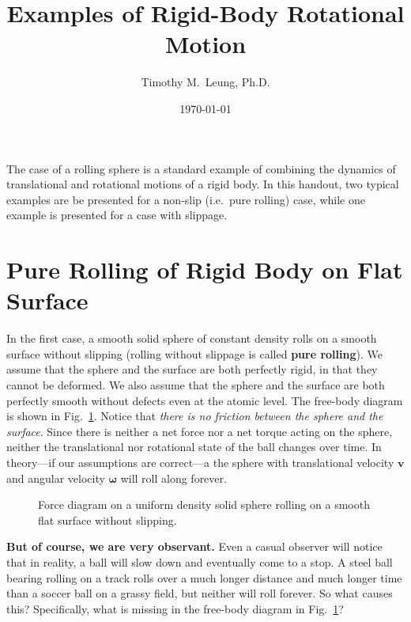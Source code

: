 \documentclass{../../../oss-handout}
\title{Examples of Rigid-Body Rotational Motion}
\author{Timothy M.\ Leung, Ph.D.}
\date{\today}
\newcommand{\mb}[1]{\mathbf{#1}}
\begin{document}
\thispagestyle{title}
\gentitle

The case of a rolling sphere is a standard example of combining the dynamics of
translational and rotational motions of a rigid body. In this handout, two
typical examples are be presented for a non-slip (i.e.\ pure rolling) case,
while one example is presented for a case with slippage.

\section{Pure Rolling of Rigid Body on Flat Surface}
\label{no-slip-ball}
In the first case, a smooth solid sphere of constant density rolls on a smooth
surface without slipping (rolling without slippage is called
\textbf{pure rolling}). We assume that the sphere and the surface are both
perfectly rigid, in that they cannot be deformed. We also assume that the sphere
and the surface are both perfectly smooth without defects even at the atomic
level. The free-body diagram is shown in Fig.~\ref{roll-flat}. Notice that
\emph{there is no friction between the sphere and the surface}. Since there is
neither a net force nor a net torque acting on the sphere, neither the
translational nor rotational state of the ball changes over time. In
theory---if our assumptions are correct---a the sphere with translational
velocity $\mb{v}$ and angular velocity $\bm{\omega}$ will roll along forever.
\begin{figure}[!ht]
  \centering
  \caption{Force diagram on a uniform density solid sphere rolling on a smooth
    flat surface without slipping.}
  \label{roll-flat}
\end{figure}

\textbf{But of course, we are very observant.} Even a casual observer will
notice that in reality, a ball will slow down and eventually come to a stop. A
steel ball bearing rolling on a track rolls over a much longer distance and
much longer time than a soccer ball on a grassy field, but neither will roll
forever. So what causes this? Specifically, what is missing in the free-body
diagram in Fig.~\ref{roll-flat}?
\end{document}
